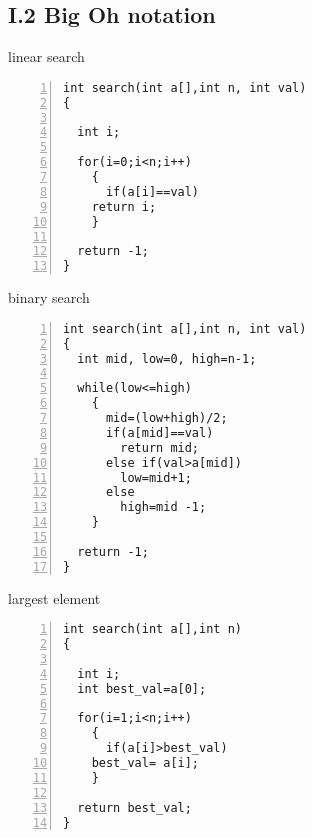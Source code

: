 \documentclass{beamer}
\begin{document}
\subsection*{I.2 Big Oh notation}


\begin{frame}[fragile]{linear search}
\begin{lstlisting}[numbers=left]
int search(int a[],int n, int val)
{

  int i;

  for(i=0;i<n;i++)
    {
      if(a[i]==val)
	return i;
    }

  return -1;
}
\end{lstlisting}
\end{frame}

\begin{frame}[fragile]{binary search}
\begin{lstlisting}[numbers=left] 
int search(int a[],int n, int val)
{
  int mid, low=0, high=n-1;

  while(low<=high)
    {
      mid=(low+high)/2;
      if(a[mid]==val)
        return mid;
      else if(val>a[mid])
        low=mid+1;
      else
        high=mid -1;
    }

  return -1;
}
\end{lstlisting}
\end{frame}

\begin{frame}[fragile]{largest element}
\begin{lstlisting}[numbers=left]
int search(int a[],int n)
{

  int i;
  int best_val=a[0];

  for(i=1;i<n;i++)
    {
      if(a[i]>best_val)
	best_val= a[i];
    }

  return best_val;
}
\end{lstlisting}
\end{frame}
\end{document}
